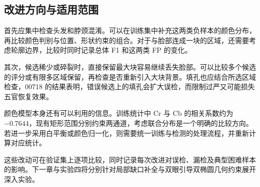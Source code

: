 \subsection{改进方向与适用范围}

首先应集中检查头发和脖颈混淆。可以在训练集中补充这两类负样本的颜色分布，再比较颜色判别与位置、形状约束的组合。对于与脸部连成一块的区域，还需要考虑轮廓边界，比较时同时记录总体 F1 和这两类 FP 的变化。

其次，候选稀少或碎裂时，直接保留最大块容易继续丢失脸部。可以比较多个候选的评分或有限多区域保留，再检查是否重新引入大块背景。填孔也应结合所选区域检查，00718 的结果表明，错误候选上的填孔会扩大误检，而限制过严又可能损失五官恢复效果。

颜色模型本身还有可以利用的信息。训练统计中 Cr 与 Cb 的相关系数约为 $-0.7644$，现有矩形范围分别约束两通道，考虑联合分布是一个明确的比较方向。若进一步采用白平衡或颜色归一化，则需要统一训练与检测的处理流程，并重新计算对应统计。

这些改动可在验证集上逐项比较，同时记录每次改进对误检、漏检及典型困难样本的影响。下一章与实验四将分别针对局部缺口补全与双眼引导双椭圆几何约束展开深入实验。
